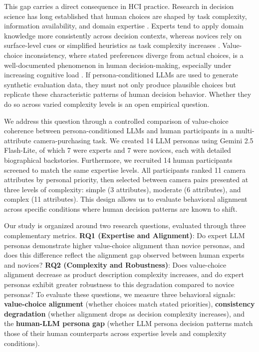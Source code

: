 \documentclass{sigchi-ext}
\begin{document}
This gap carries a direct consequence in HCI practice. Research in decision science has long established that human choices are shaped by task complexity, information availability, and domain expertise \cite{payne1993adaptive}. Experts tend to apply domain knowledge more consistently across decision contexts, whereas novices rely on surface-level cues or simplified heuristics as task complexity increases \cite{payne1993adaptive}. Value-choice inconsistency, where stated preferences diverge from actual choices, is a well-documented phenomenon in human decision-making, especially under increasing cognitive load \cite{Tversky}. If persona-conditioned LLMs are used to generate synthetic evaluation data, they must not only produce plausible choices but replicate these characteristic patterns of human decision behavior. Whether they do so across varied complexity levels is an open empirical question.

We address this question through a controlled comparison of value-choice coherence between persona-conditioned LLMs and human participants in a multi-attribute camera-purchasing task. We created 14 LLM personas using Gemini 2.5 Flash-Lite, of which 7 were experts and 7 were novices, each with detailed biographical backstories. Furthermore, we recruited 14 human participants screened to match the same expertise levels. All participants ranked 11 camera attributes by personal priority, then selected between camera pairs presented at three levels of complexity: simple (3 attributes), moderate (6 attributes), and complex (11 attributes). This design allows us to evaluate behavioral alignment across specific conditions where human decision patterns are known to shift.

Our study is organized around two research questions, evaluated through three complementary metrics. \textbf{RQ1 (Expertise and Alignment)}: Do expert LLM personas demonstrate higher value-choice alignment than novice personas, and does this difference reflect the alignment gap observed between human experts and novices? \textbf{RQ2 (Complexity and Robustness)}: Does value-choice alignment decrease as product description complexity increases, and do expert personas exhibit greater robustness to this degradation compared to novice personas? To evaluate these questions, we measure three behavioral signals: \textbf{value-choice alignment} (whether choices match stated priorities), \textbf{consistency degradation} (whether alignment drops as decision complexity increases), and the \textbf{human-LLM persona gap} (whether LLM persona decision patterns match those of their human counterparts across expertise levels and complexity conditions).
\end{document}

